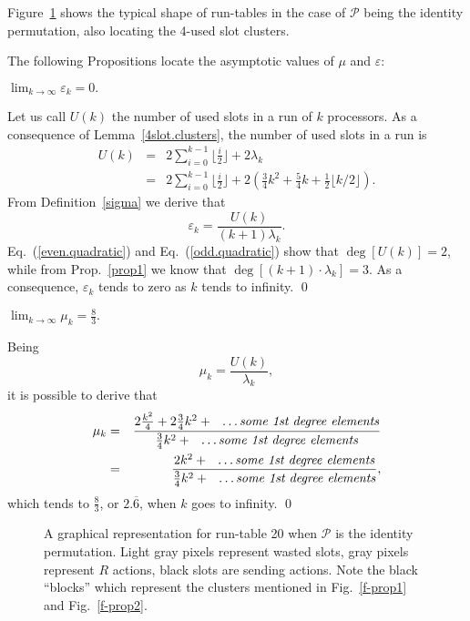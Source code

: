 \documentclass{elsart}
\newcommand{\floor}[1]{{\lfloor{#1}\rfloor}}
\begin{document}
Figure~\ref{z20} shows the typical shape of run-tables 
in the case of $\mathcal P$ being the identity permutation, also
locating the 4-used slot clusters. 



The following Propositions locate the asymptotic values of $\mu$ and $\varepsilon$:
\begin{prop}\label{id-eps}
$\lim_{k\rightarrow\infty}\varepsilon_k=0.$
\end{prop}
\begin{pf}
Let us call $U(k)$ the number of used slots in a run of $k$ processors.
As a consequence of Lemma~\ref{4slot.clusters}, the number of used slots in a run is
\begin{eqnarray}
U(k) &=& 2\sum_{i=0}^{k-1} \floor{\frac{i}{2}} + 2 \lambda_k \nonumber\\
     &=& 2\sum_{i=0}^{k-1} \floor{\frac{i}{2}} + 2 (\frac34k^2 + \frac54k + \frac12\floor{k/2}).
\end{eqnarray}
From Definition~\ref{sigma} we derive that
\begin{equation}\label{epsilon}
\varepsilon_k = \frac{U(k)}{(k+1)\lambda_k}.
\end{equation}
Eq.~(\ref{even.quadratic}) and Eq.~(\ref{odd.quadratic}) show that 
$\deg [U(k)]=2$,
while from Prop.~\ref{prop1} we know that $\deg [(k+1)\cdot\lambda_k] = 3$.
As a consequence, $\varepsilon_k$ tends to zero as $k$ tends to infinity.
\qed
\end{pf}

\begin{prop}\label{id-mu}
$\lim_{k\rightarrow\infty}\mu_k=\frac{8}3.$
\end{prop}
\begin{pf}
Being 
\begin{equation}\label{mu}
\mu_k = \frac{U(k)}{\lambda_k},
\end{equation}
it is possible to derive that
\begin{eqnarray}
\mu_k &=& \frac{2\frac{k^2}4 + 2 \frac34k^2 + \hbox{ \emph{ \ldots some 1st degree elements}}}{\frac34k^2 + \hbox{ \emph{ \ldots some 1st degree elements}}}\nonumber \\
      &=& \frac{2k^2 + \hbox{ \emph{ \ldots some 1st degree elements}}}{\frac34k^2 + \hbox{ \emph{ \ldots some 1st degree elements}}},
\end{eqnarray}
which tends to $\frac{8}3$, or $2.\overline{6}$, when $k$ goes to infinity.
\qed
\end{pf}

\begin{figure}
\centerline{}
\caption{A graphical representation for run-table 20 when $\mathcal P$ is
the identity permutation. Light gray pixels represent wasted slots, 
gray pixels represent $R$ actions, black slots are sending actions.
Note the black ``blocks'' which represent the clusters mentioned 
in Fig.~\ref{f-prop1} and Fig.~\ref{f-prop2}.}
\label{z20}
\end{figure}
\end{document}

